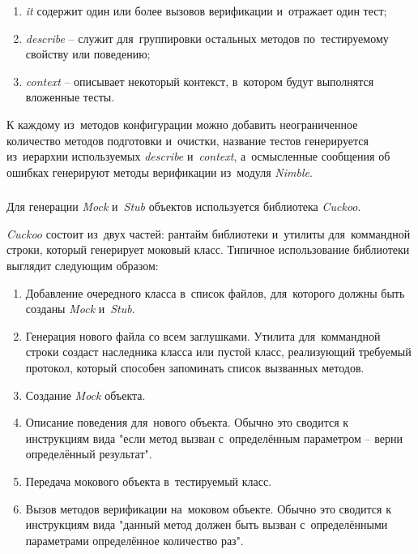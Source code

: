 \begin{enumerate}
	\item \textit{it} содержит один или более вызовов верификации и~отражает один тест;
	\item \textit{describe} -- служит для~группировки остальных методов по~тестируемому свойству или поведению;
	\item \textit{context} -- описывает некоторый контекст, в~котором будут выполнятся вложенные тесты.
\end{enumerate}

К каждому из~методов конфигурации можно добавить неограниченное количество методов подготовки и~очистки, название тестов генерируется из~иерархии используемых \textit{describe} и~\textit{context}, а~осмысленные сообщения об ошибках генерируют методы верификации из~модуля \textit{Nimble}.

\subsubsection{}
\label{sec:testing:tech:cuckoo}
Для генерации \textit{Mock} и~\textit{Stub} объектов используется библиотека \textit{Cuckoo}.

\textit{Cuckoo} состоит из~двух частей: рантайм библиотеки и~утилиты для~коммандной строки, который генерирует моковый класс. Типичное использование библиотеки выглядит следующим образом:

\begin{enumerate}
	\item Добавление очередного класса в~список файлов, для~которого должны быть созданы \textit{Mock} и~\textit{Stub}.
	\item Генерация нового файла со всем заглушками. Утилита для~коммандной строки создаст наследника класса или пустой класс, реализующий требуемый протокол, который способен запоминать список вызванных методов.
	\item Создание \textit{Mock} объекта.
	\item Описание поведения для~нового объекта. Обычно это сводится к инструкциям вида "если метод вызван с~определённым параметром -- верни определённый результат".
	\item Передача мокового объекта в~тестируемый класс.
	\item Вызов методов верификации на~моковом объекте. Обычно это сводится к инструкциям вида "данный метод должен быть вызван с~определёнными параметрами определённое количество раз".
\end{enumerate}